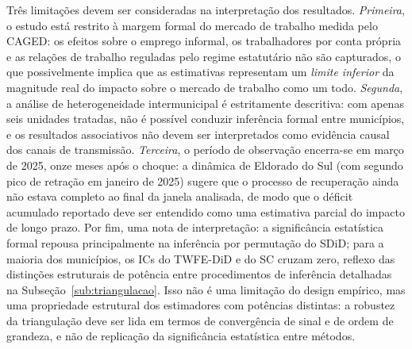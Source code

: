 \documentclass[a4paper,12pt]{article}
\begin{document}
Três limitações devem ser consideradas na interpretação dos resultados. \emph{Primeira},
o estudo está restrito à margem formal do mercado de trabalho medida pelo CAGED:
os efeitos sobre o emprego informal, os trabalhadores por conta própria e as relações de
trabalho reguladas pelo regime estatutário não são capturados, o que possivelmente
implica que as estimativas representam um \emph{limite inferior} da magnitude real do
impacto sobre o mercado de trabalho como um todo. \emph{Segunda}, a análise de
heterogeneidade intermunicipal é estritamente descritiva: com apenas seis unidades
tratadas, não é possível conduzir inferência formal entre municípios, e os resultados
associativos não devem ser interpretados como evidência causal dos canais de transmissão.
\emph{Terceira}, o período de observação encerra-se em março de 2025, onze meses após
o choque: a dinâmica de Eldorado do Sul (com segundo pico de retração em janeiro de
2025) sugere que o processo de recuperação ainda não estava completo ao final da janela
analisada, de modo que o déficit acumulado reportado deve ser entendido como uma
estimativa parcial do impacto de longo prazo. Por fim, uma nota de interpretação: a significância estatística formal repousa
principalmente na inferência por permutação do SDiD; para a maioria dos municípios,
os ICs do TWFE-DiD e do SC cruzam zero, reflexo das distinções estruturais de
potência entre procedimentos de inferência detalhadas na Subseção~\ref{sub:triangulacao}.
Isso não é uma limitação do design empírico, mas uma propriedade estrutural dos
estimadores com potências distintas: a robustez da triangulação deve ser lida em termos
de convergência de sinal e de ordem de grandeza, e não de replicação da significância
estatística entre métodos.
\end{document}
